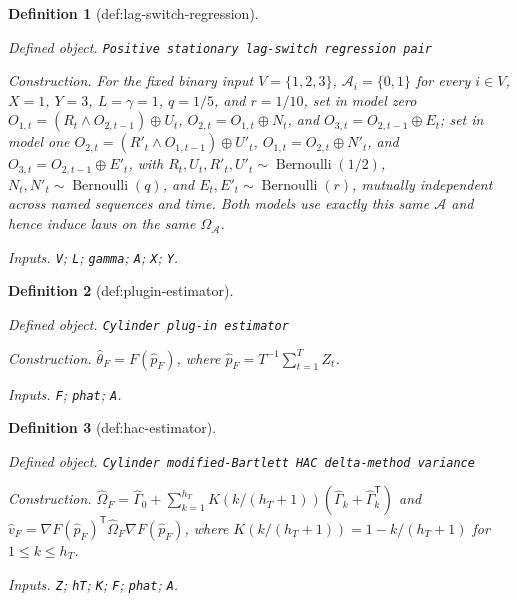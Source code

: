 \documentclass{article}
\newtheorem{definition}{Definition}
\begin{document}
\begin{definition}[def:lag-switch-regression]\label{def:lag-switch-regression}
\par\smallskip\noindent\emph{Defined object.} \texttt{Positive stationary lag-\allowbreak{}switch regression pair}
\par\smallskip\noindent\emph{Construction.} For the fixed binary input \(V=\{1,2,3\}\), \(\mathcal A_i=\{0,1\}\) for every \(i\in V\), \(X=1\), \(Y=3\), \(L=\gamma=1\), \(q=1/5\), and \(r=1/10\), set in model zero \(O_{1,t}=(R_t\wedge O_{2,t-1})\oplus U_t\), \(O_{2,t}=O_{1,t}\oplus N_t\), and \(O_{3,t}=O_{2,t-1}\oplus E_t\); set in model one \(O_{2,t}=(R'_t\wedge O_{1,t-1})\oplus U'_t\), \(O_{1,t}=O_{2,t}\oplus N'_t\), and \(O_{3,t}=O_{2,t-1}\oplus E'_t\), with \(R_t,U_t,R'_t,U'_t\sim\operatorname{Bernoulli}(1/2)\), \(N_t,N'_t\sim\operatorname{Bernoulli}(q)\), and \(E_t,E'_t\sim\operatorname{Bernoulli}(r)\), mutually independent across named sequences and time. Both models use exactly this same \(\mathcal A\) and hence induce laws on the same \(\Omega_{\mathcal A}\).
\par\smallskip\noindent\emph{Inputs.} \texttt{V}; \texttt{L}; \texttt{gamma}; \texttt{A}; \texttt{X}; \texttt{Y}.
\end{definition}

\begin{definition}[def:plugin-estimator]\label{def:plugin-estimator}
\par\smallskip\noindent\emph{Defined object.} \texttt{Cylinder plug-\allowbreak{}in estimator}
\par\smallskip\noindent\emph{Construction.} \(\widehat\theta_F=F(\widehat p_F)\), where \(\widehat p_F=T^{-1}\sum_{t=1}^{T}Z_t\).
\par\smallskip\noindent\emph{Inputs.} \texttt{F}; \texttt{phat}; \texttt{A}.
\end{definition}

\begin{definition}[def:hac-estimator]\label{def:hac-estimator}
\par\smallskip\noindent\emph{Defined object.} \texttt{Cylinder modified-\allowbreak{}Bartlett HAC delta-\allowbreak{}method variance}
\par\smallskip\noindent\emph{Construction.} \(\widehat\Omega_F=\widehat\Gamma_0+\sum_{k=1}^{h_T}K(k/(h_T+1))(\widehat\Gamma_k+\widehat\Gamma_k^{\mathsf T})\) and \(\widehat v_F=\nabla F(\widehat p_F)^{\mathsf T}\widehat\Omega_F\nabla F(\widehat p_F)\), where \(K(k/(h_T+1))=1-k/(h_T+1)\) for \(1\le k\le h_T\).
\par\smallskip\noindent\emph{Inputs.} \texttt{Z}; \texttt{hT}; \texttt{K}; \texttt{F}; \texttt{phat}; \texttt{A}.
\end{definition}
\end{document}
